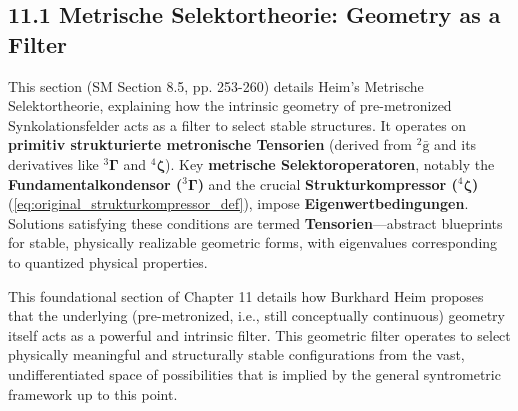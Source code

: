 \documentclass[12pt]{article}
\newcommand{\kompositionsfeld}{{}^2\bar{\mathrm{g}}}
\newcommand{\fundamentalkondensor}{{}^3\bm{\Gamma}}
\newcommand{\strukturkompressor}{{}^4\bm{\zeta}}
\begin{document}
\subsection{11.1 Metrische Selektortheorie: Geometry as a Filter}
\label{sec:selektortheorie}

This section (SM Section 8.5, pp. 253-260) details Heim's Metrische Selektortheorie, explaining how the intrinsic geometry of pre-metronized Synkolationsfelder acts as a filter to select stable structures. It operates on \textbf{primitiv strukturierte metronische Tensorien} (derived from \( \kompositionsfeld \) and its derivatives like \(\fundamentalkondensor\) and \(\strukturkompressor\)). Key \textbf{metrische Selektoroperatoren}, notably the \textbf{Fundamentalkondensor (\(\fundamentalkondensor\))} and the crucial \textbf{Strukturkompressor (\(\strukturkompressor\))} (\eqref{eq:original_strukturkompressor_def}), impose \textbf{Eigenwertbedingungen}. Solutions satisfying these conditions are termed \textbf{Tensorien}—abstract blueprints for stable, physically realizable geometric forms, with eigenvalues corresponding to quantized physical properties.

This foundational section of Chapter 11 details how Burkhard Heim proposes that the underlying (pre-metronized, i.e., still conceptually continuous) geometry itself acts as a powerful and intrinsic filter. This geometric filter operates to select physically meaningful and structurally stable configurations from the vast, undifferentiated space of possibilities that is implied by the general syntrometric framework up to this point.
\end{document}
